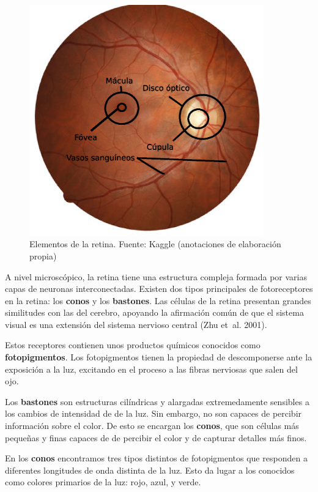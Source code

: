 \documentclass[
  12pt,
  spanish,
  a4paperpaper,
]{report}
\begin{document}
\begin{figure}
\centering
\includegraphics[width=0.9\textwidth,height=\textheight]{source/figures/sitnice.eps}
\caption{Elementos de la retina. Fuente: Kaggle (anotaciones de
elaboración propia) \label{retina}}
\end{figure}

A nivel microscópico, la retina tiene una estructura compleja formada
por varias capas de neuronas interconectadas. Existen dos tipos
principales de fotoreceptores en la retina: los \textbf{conos} y los
\textbf{bastones}. Las células de la retina presentan grandes
similitudes con las del cerebro, apoyando la afirmación común de que el
sistema visual es una extensión del sistema nervioso central (Zhu et~al.
2001).

Estos receptores contienen unos productos químicos conocidos como
\textbf{fotopigmentos}. Los fotopigmentos tienen la propiedad de
descomponerse ante la exposición a la luz, excitando en el proceso a las
fibras nerviosas que salen del ojo.

Los \textbf{bastones} son estructuras cilíndricas y alargadas
extremedamente sensibles a los cambios de intensidad de de la luz. Sin
embargo, no son capaces de percibir información sobre el color. De esto
se encargan los \textbf{conos}, que son células más pequeñas y finas
capaces de de percibir el color y de capturar detalles más finos.

En los \textbf{conos} encontramos tres tipos distintos de fotopigmentos
que responden a diferentes longitudes de onda distinta de la luz. Esto
da lugar a los conocidos como colores primarios de la luz: rojo, azul, y
verde.
\end{document}
